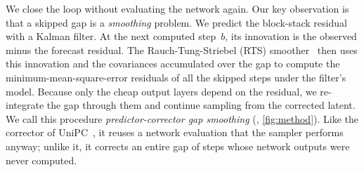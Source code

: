 We close the loop without evaluating the network again. Our key observation is that a skipped gap is a
\emph{smoothing} problem. 
We predict the block-stack residual with a Kalman filter. At the next computed step~$b$, its innovation is the observed minus the forecast residual. The Rauch-Tung-Striebel (RTS) smoother~\cite{rauch1965maximum} then uses this innovation and the covariances accumulated over the gap to compute the minimum-mean-square-error residuals of all the skipped steps under the filter's model.
Because only the cheap output layers depend on the residual,
we re-integrate the gap through them and continue sampling from the corrected latent. We call this procedure \emph{predictor-corrector gap smoothing} (\pcgs,
\cref{fig:method}). Like the corrector of UniPC~\cite{zhao2023unipc}, it reuses a network evaluation that the sampler
performs anyway; unlike it, it corrects an entire gap of steps whose network outputs were never computed.


